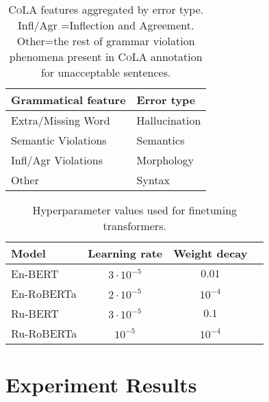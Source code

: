\documentclass[11pt]{article}
\begin{document}
\begin{table}[th!]
\centering
\small 
\newcommand{\hsp}{\hspace{4pt}}
\begin{tabular}{p{3cm}|p{2cm}} 
\toprule
\textbf{Grammatical feature} & {\textbf{Error type}}   \\
\midrule
Extra/Missing Word  & Hallucination \\
Semantic Violations &  Semantics \\
Infl/Agr Violations  &  Morphology\\
Other  &  Syntax\\
\bottomrule
\end{tabular}
\caption{\textsc{CoLA} features aggregated by error type. Infl/Agr =Inflection and
Agreement. Other=the rest of grammar violation phenomena present in \textsc{CoLA} annotation for unacceptable sentences.}
\label{tab:en-cola-groups}
\end{table}

\begin{table}[th!]
\centering
\small 
\begin{tabular}{lccc} 
\toprule
\textbf{Model} & \textbf{Learning rate}  &  \textbf{Weight decay} \\
\midrule
En-BERT & $3\cdot 10^{-5}$ & $0.01$  \\
En-RoBERTa & $2\cdot 10^{-5}$ & $10^{-4}$\\ 
Ru-BERT & $3\cdot 10^{-5}$ & $0.1$\\
Ru-RoBERTa &  $10^{-5}$ & $10^{-4}$\\
\bottomrule
\end{tabular}
\caption{Hyperparameter values used for finetuning transformers.}
\label{tab:bert_hyperparameters}
\end{table}


\newpage
\clearpage

\section{Experiment Results}
\end{document}
